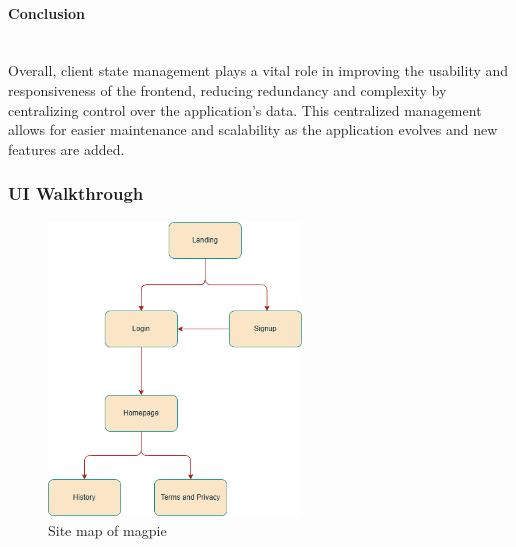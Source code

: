     \paragraph{Conclusion}\mbox{}\\
    \newline
    Overall, client state management plays a vital role in improving the usability and responsiveness of the frontend, reducing redundancy and complexity by centralizing control over the application’s data. This centralized management allows for easier maintenance and scalability as the application evolves and new features are added.

\subsubsection{UI Walkthrough}
\begin{figure}[h]
    \centering
    \includegraphics[width=0.6\textwidth]{images/site/sitemap.png}
    \caption{Site map of magpie}
\end{figure}
